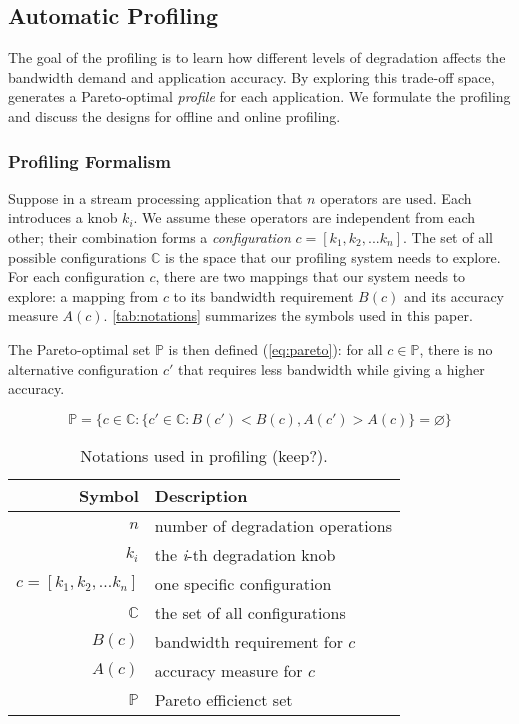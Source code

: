 \subsection{Automatic Profiling}
\label{sec:automatic-profiling}

The goal of the profiling is to learn how different levels of degradation
affects the bandwidth demand and application accuracy. By exploring this
trade-off space, \sysname{} generates a Pareto-optimal \textit{profile} for each
application. We formulate the profiling and discuss the designs for offline and
online profiling.

\subsubsection{Profiling Formalism}
\label{sec:formalize-profiling}

Suppose in a stream processing application that $n$ \maybe{} operators are
used. Each introduces a knob $k_i$. We assume these operators are independent
from each other; their combination forms a \textit{configuration}
$c = [k_{1}, k_{2}, ... k_{n}]$. The set of all possible configurations
$\mathbb{C}$ is the space that our profiling system needs to explore. For each
configuration $c$, there are two mappings that our system needs to explore: a
mapping from $c$ to its bandwidth requirement $B(c)$ and its accuracy measure
$A(c)$. \autoref{tab:notations} summarizes the symbols used in this paper.

The Pareto-optimal set $\mathbb{P}$ is then defined (\autoref{eq:pareto}): for
all $c \in \mathbb{P}$, there is no alternative configuration $c'$ that requires
less bandwidth while giving a higher accuracy.

{\small
\begin{equation}
  \mathbb{P} = \{ c \in \mathbb{C} : \{ c' \in \mathbb{C}: B(c') < B(c),
  A(c') > A(c) \} = \varnothing\}
  \label{eq:pareto}
\end{equation}
}%

\begin{table}
  \small
  \centering
  \begin{tabular}{r l}
    \toprule
    \textbf{Symbol} & \textbf{Description} \\
    \midrule
    $n$ & number of degradation operations \\
    $k_i$ & the \textit{i}-th degradation knob \\
    $c = [k_{1}, k_{2}, ... k_{n}]$ & one specific configuration \\
    $\mathbb{C}$ & the set of all configurations \\
    \midrule
    $B(c)$ & bandwidth requirement for $c$ \\
    $A(c)$ & accuracy measure for $c$ \\
    $\mathbb{P}$ & Pareto efficienct set \\
    \bottomrule
  \end{tabular}
  \caption{Notations used in profiling (keep?).}
  \label{tab:notations}
\end{table}

